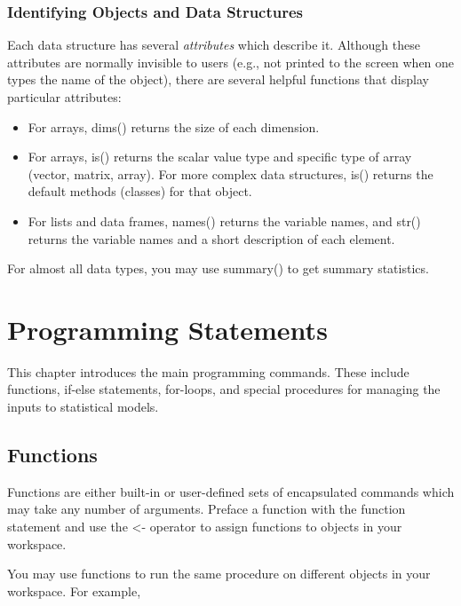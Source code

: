 \documentclass[letterpaper,10pt,english]{sphinxmanual}
\begin{document}
\subsection{Identifying Objects and Data Structures}
\label{6_R_objects:identifying-objects-and-data-structures}
Each data structure has several \emph{attributes} which describe it. Although
these attributes are normally invisible to users (e.g., not printed to
the screen when one types the name of the object), there are several
helpful functions that display particular attributes:
\begin{itemize}
\item {} 
For arrays, dims() returns the size of each dimension.

\item {} 
For arrays, is() returns the scalar value type and specific type of
array (vector, matrix, array). For more complex data structures, is()
returns the default methods (classes) for that object.

\item {} 
For lists and data frames, names() returns the variable names, and
str() returns the variable names and a short description of each
element.

\end{itemize}

For almost all data types, you may use summary() to get summary
statistics.


\chapter{Programming Statements}
\label{7_programming_statements:programming-statements}\label{7_programming_statements::doc}
This chapter introduces the main programming commands. These include
functions, if-else statements, for-loops, and special procedures for
managing the inputs to statistical models.


\section{Functions}
\label{7_programming_statements:functions}
Functions are either built-in or user-defined sets of encapsulated
commands which may take any number of arguments. Preface a function with
the function statement and use the \textless{}- operator to assign functions to
objects in your workspace.

You may use functions to run the same procedure on different objects in
your workspace. For example,
\end{document}
